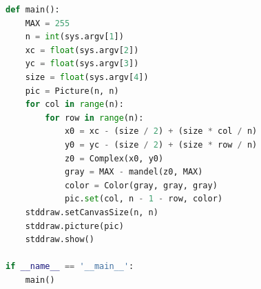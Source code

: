 \documentclass[8pt,a4paper,compress]{beamer}
\begin{document}
\begin{frame}[fragile]
\pause

\begin{lstlisting}[language=Python]
def main():
    MAX = 255
    n = int(sys.argv[1])
    xc = float(sys.argv[2])
    yc = float(sys.argv[3])
    size = float(sys.argv[4])
    pic = Picture(n, n)
    for col in range(n):
        for row in range(n):
            x0 = xc - (size / 2) + (size * col / n)
            y0 = yc - (size / 2) + (size * row / n)
            z0 = Complex(x0, y0)
            gray = MAX - mandel(z0, MAX)
            color = Color(gray, gray, gray)
            pic.set(col, n - 1 - row, color)
    stddraw.setCanvasSize(n, n)
    stddraw.picture(pic)
    stddraw.show()

if __name__ == '__main__':
    main()
\end{lstlisting}
\end{frame}
\end{document}
